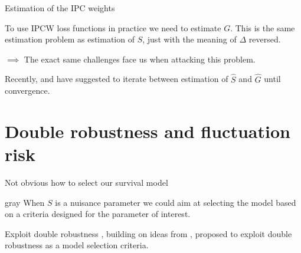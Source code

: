 \documentclass[smaller]{beamer}\usepackage{listings}
\begin{document}
\begin{frame}[label={sec:orga0ca51f}]{Estimation of the IPC weights}
\small

To use IPCW loss functions in practice we need to estimate \(G\). This is the same estimation
problem as estimation of \(S\), just with the meaning of \(\Delta\) reversed. 

\vfill \pause

\(\implies\) The exact same challenges face us when attacking this problem.

\vfill

\def\shift{2.3}
\def\ls{}
\def\lw{.5mm}
\begin{center}
\end{center}

\vfill

Recently, \cite{han2021inverse} and \cite{westling2021inference} have suggested to iterate between
estimation of \(\hat S\) and \(\hat G\) until convergence.
\end{frame}


\section{Double robustness and fluctuation risk}
\label{sec:org76f3856}
\begin{frame}[label={sec:org85d1d0f}]{}
\begin{block}{\centering Not obvious how to select our survival model}
\pause
\end{block}
\begin{block}{}
\end{block}
\begin{beamercolorbox}[rounded=true]{gray}
\centering When \(S\) is a nuisance parameter we could aim at selecting the model based on a
criteria designed for the parameter of interest. \pause
\end{beamercolorbox}

\begin{block}{}
\end{block}

\begin{block}{Exploit double robustness}
\pause \cite{tchetgenYifanTagetDML}, building on ideas from \cite{robins2007comment}, proposed to
exploit double robustness as a model selection criteria.
\end{block}
\end{frame}
\end{document}
